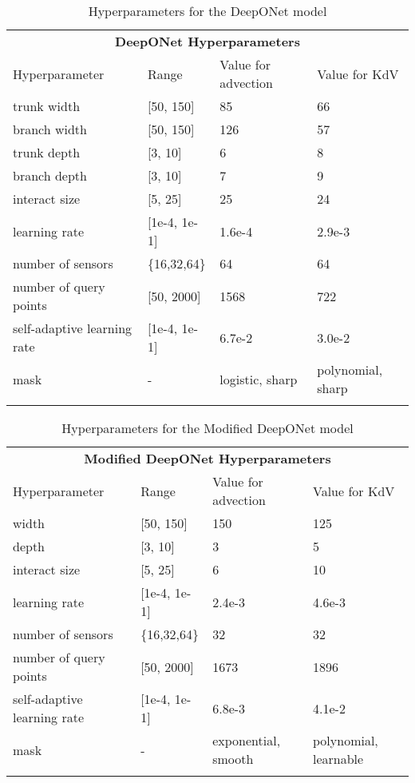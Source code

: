\begin{table}[h]
    \centering
    \caption{Hyperparameters for the DeepONet model}
    \begin{tabular}{@{}llll@{}}
    \multicolumn{4}{c}{\textbf{DeepONet Hyperparameters}} \\  %
    \cmidrule(r){1-4}  %
    Hyperparameter & Range & Value for advection & Value for KdV \\
    \midrule
    trunk width & [50, 150] & 85 & 66 \\
    branch width & [50, 150] & 126 & 57\\
    trunk depth & [3, 10] & 6 & 8 \\
    branch depth & [3, 10] & 7 & 9\\
    interact size & [5, 25] & 25 & 24 \\
    learning rate  & [1e-4, 1e-1] & 1.6e-4 & 2.9e-3\\
    number of sensors & \{16,32,64\} & 64 & 64\\
    number of query points & [50, 2000] & 1568 & 722\\ 
    self-adaptive learning rate & [1e-4, 1e-1] & 6.7e-2 & 3.0e-2\\
    mask & - & logistic, sharp & polynomial, sharp \\
    \label{tab:hyperparameter_search_space_don}
    \end{tabular}
\end{table}

\begin{table}[h]
    \centering
    \caption{Hyperparameters for the Modified DeepONet model}
    \begin{tabular}{@{}llll@{}}
    \multicolumn{4}{c}{\textbf{Modified DeepONet Hyperparameters}} \\  %
    \cmidrule(r){1-4}  %
    Hyperparameter & Range & Value for advection & Value for KdV \\
    \midrule
    width & [50, 150] & 150 & 125 \\
    depth & [3, 10] & 3 & 5 \\
    interact size & [5, 25] & 6 & 10 \\
    learning rate  & [1e-4, 1e-1] & 2.4e-3 & 4.6e-3\\
    number of sensors & \{16,32,64\} & 32 & 32\\
    number of query points & [50, 2000] & 1673 & 1896\\ 
    self-adaptive learning rate & [1e-4, 1e-1] & 6.8e-3 & 4.1e-2\\
    mask & - & exponential, smooth & polynomial, learnable \\
    \label{tab:hyperparameter_search_space_mod_don}
    \end{tabular}
\end{table}

